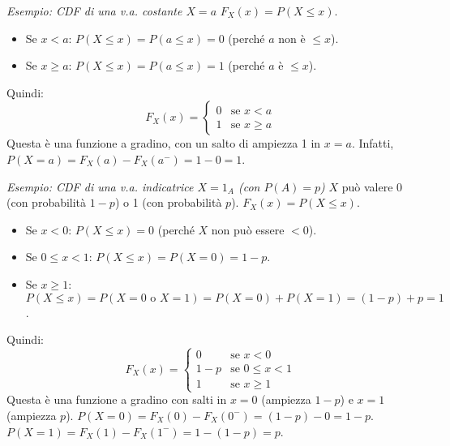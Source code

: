 \textit{Esempio: CDF di una v.a. costante $X=a$}
$F_X(x) = P(X \le x)$.
\begin{itemize}
    \item Se $x < a$: $P(X \le x) = P(a \le x) = 0$ (perché $a$ non è $\le x$).
    \item Se $x \ge a$: $P(X \le x) = P(a \le x) = 1$ (perché $a$ è $\le x$).
\end{itemize}
Quindi:
\[ F_X(x) = \begin{cases} 0 & \text{se } x < a \\ 1 & \text{se } x \ge a \end{cases} \]
Questa è una funzione a gradino, con un salto di ampiezza 1 in $x=a$. Infatti, $P(X=a) = F_X(a) - F_X(a^-) = 1 - 0 = 1$.

\textit{Esempio: CDF di una v.a. indicatrice $X=1_A$ (con $P(A)=p$)}
$X$ può valere 0 (con probabilità $1-p$) o 1 (con probabilità $p$).
$F_X(x) = P(X \le x)$.
\begin{itemize}
    \item Se $x < 0$: $P(X \le x) = 0$ (perché $X$ non può essere $<0$).
    \item Se $0 \le x < 1$: $P(X \le x) = P(X=0) = 1-p$.
    \item Se $x \ge 1$: $P(X \le x) = P(X=0 \text{ o } X=1) = P(X=0) + P(X=1) = (1-p)+p = 1$.
\end{itemize}
Quindi:
\[ F_X(x) = \begin{cases} 0 & \text{se } x < 0 \\ 1-p & \text{se } 0 \le x < 1 \\ 1 & \text{se } x \ge 1 \end{cases} \]
Questa è una funzione a gradino con salti in $x=0$ (ampiezza $1-p$) e $x=1$ (ampiezza $p$).
$P(X=0) = F_X(0) - F_X(0^-) = (1-p) - 0 = 1-p$.
$P(X=1) = F_X(1) - F_X(1^-) = 1 - (1-p) = p$.



